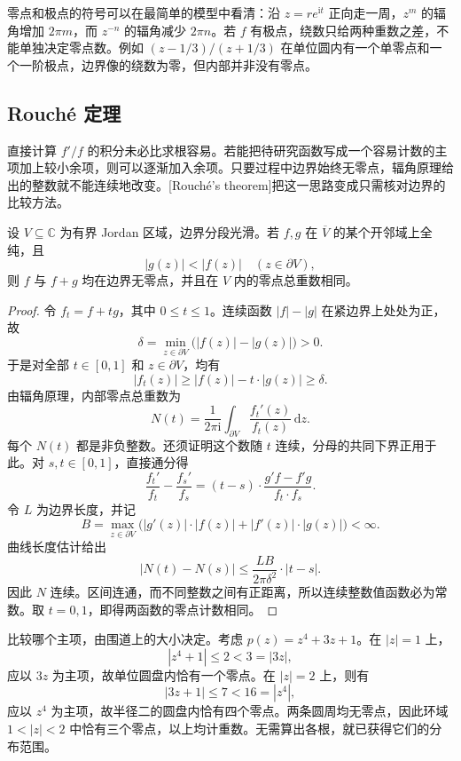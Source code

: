 零点和极点的符号可以在最简单的模型中看清：沿 \(z=re^{\mathrm{i}t}\) 正向走一周，\(z^m\) 的辐角增加 \(2\pi m\)，而 \(z^{-n}\) 的辐角减少 \(2\pi n\)。若 \(f\) 有极点，绕数只给两种重数之差，不能单独决定零点数。例如 \((z-1/3)/(z+1/3)\) 在单位圆内有一个单零点和一个一阶极点，边界像的绕数为零，但内部并非没有零点。

\subsection{Rouché 定理}
\label{b3:subsec:030402}

直接计算 \(f'/f\) 的积分未必比求根容易。若能把待研究函数写成一个容易计数的主项加上较小余项，则可以逐渐加入余项。只要过程中边界始终无零点，辐角原理给出的整数就不能连续地改变。[Rouché's theorem]把这一思路变成只需核对边界的比较方法。

\begin{theorem}[Rouché]\label{b3:thm:03-rouche}
设 \(V\subseteq\mathbb C\) 为有界 Jordan 区域，边界分段光滑。若 \(f,g\) 在 \(\overline V\) 的某个开邻域上全纯，且
\[
 |g(z)|<|f(z)|\quad(z\in\partial V),
\]
则 \(f\) 与 \(f+g\) 均在边界无零点，并且在 \(V\) 内的零点总重数相同。
\end{theorem}
\begin{proof}
令 \(f_t=f+tg\)，其中 \(0\le t\le1\)。连续函数 \(|f|-|g|\) 在紧边界上处处为正，故
\[
 \delta=\min_{z\in\partial V}\bigl(|f(z)|-|g(z)|\bigr)>0.
\]
于是对全部 \(t\in[0,1]\) 和 \(z\in\partial V\)，均有
\[
 |f_t(z)|\ge |f(z)|-t\cdot|g(z)|\ge\delta.
\]
由辐角原理，内部零点总重数为
\[
 N(t)=\frac1{2\pi\mathrm{i}}\int_{\partial V}
                \frac{f_t'(z)}{f_t(z)}\,\mathrm{d}z.
\]
每个 \(N(t)\) 都是非负整数。还须证明这个数随 \(t\) 连续，分母的共同下界正用于此。对 \(s,t\in[0,1]\)，直接通分得
\[
 \frac{f_t'}{f_t}-\frac{f_s'}{f_s}
 =(t-s)\cdot\frac{g'f-f'g}{f_t\cdot f_s}.
\]
令 \(L\) 为边界长度，并记
\[
 B=\max_{z\in\partial V}
 \bigl(|g'(z)|\cdot|f(z)|+|f'(z)|\cdot|g(z)|\bigr)<\infty.
\]
曲线长度估计给出
\[
 |N(t)-N(s)|\le\frac{LB}{2\pi\delta^2}\cdot|t-s|.
\]
因此 \(N\) 连续。区间连通，而不同整数之间有正距离，所以连续整数值函数必为常数。取 \(t=0,1\)，即得两函数的零点计数相同。
\end{proof}

比较哪个主项，由围道上的大小决定。考虑 \(p(z)=z^4+3z+1\)。在 \(|z|=1\) 上，
\[
 |z^4+1|\le2<3=|3z|,
\]
应以 \(3z\) 为主项，故单位圆盘内恰有一个零点。在 \(|z|=2\) 上，则有
\[
 |3z+1|\le7<16=|z^4|,
\]
应以 \(z^4\) 为主项，故半径二的圆盘内恰有四个零点。两条圆周均无零点，因此环域 \(1<|z|<2\) 中恰有三个零点，以上均计重数。无需算出各根，就已获得它们的分布范围。

